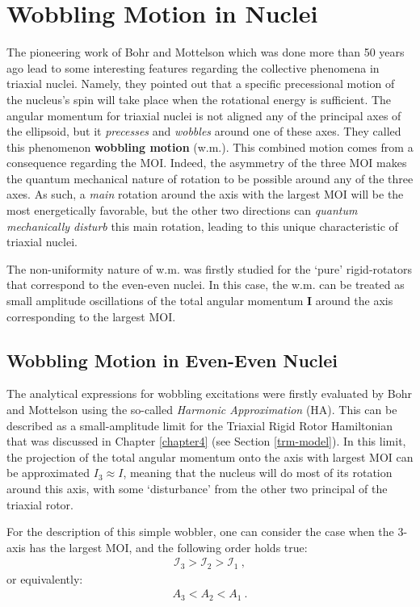 \chapter{Wobbling Motion in Nuclei}

The pioneering work of Bohr and Mottelson \cite{bohr1998nuclear} which was done more than 50 years ago lead to some interesting features regarding the collective phenomena in triaxial nuclei. Namely, they pointed out that a specific precessional motion of the nucleus's spin will take place when the rotational energy is sufficient. The angular momentum for triaxial nuclei is not aligned any of the principal axes of the ellipsoid, but it \emph{precesses} and \emph{wobbles} around one of these axes. They called this phenomenon \textbf{wobbling motion} (w.m.).
This combined motion comes from a consequence regarding the MOI. Indeed, the asymmetry of the three MOI makes the quantum mechanical nature of rotation to be possible around any of the three axes. As such, a \emph{main} rotation around the axis with the largest MOI will be the most energetically favorable, but the other two directions can \emph{quantum mechanically disturb} this main rotation, leading to this unique characteristic of triaxial nuclei.

The non-uniformity nature of w.m. was firstly studied for the `pure' rigid-rotators that correspond to the even-even nuclei. In this case, the w.m. can be treated as small amplitude oscillations of the total angular momentum $\mathbf{I}$ around the axis corresponding to the largest MOI.

\section{Wobbling Motion in Even-Even Nuclei}

The analytical expressions for wobbling excitations were firstly evaluated by Bohr and Mottelson using the so-called \emph{Harmonic Approximation} (HA). This can be described as a small-amplitude limit for the Triaxial Rigid Rotor Hamiltonian that was discussed in Chapter \ref{chapter4} (see Section \ref{trm-model}). In this limit, the projection of the total angular momentum onto the axis with largest MOI can be approximated $I_3\approx I$, meaning that the nucleus will do most of its rotation around this axis, with some `disturbance' from the other two principal of the triaxial rotor. 

For the description of this simple wobbler, one can consider the case when the $3$-axis has the largest MOI, and the following order holds true:
\begin{align}
    \mathcal{I}_3>\mathcal{I}_2>\mathcal{I}_1\ ,
\end{align}
or equivalently:
\begin{align}
    A_3<A_2<A_1\ .
\end{align}

